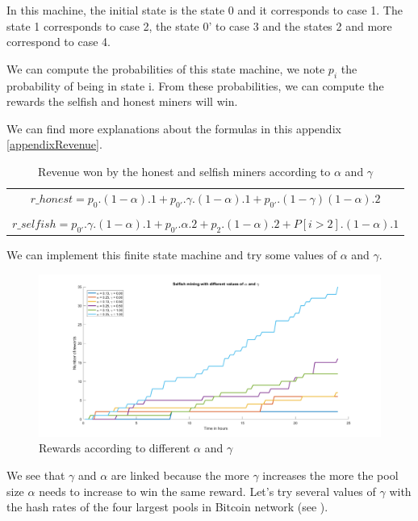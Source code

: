 In this machine, the initial state is the state 0 and it corresponds to case 1. The state 1 corresponds to case 2, the state 0' to case 3 and the states 2 and more correspond to case 4. \newline

We can compute the probabilities of this state machine, we note $p_i$ the probability of being in state i. From these probabilities, we can compute the rewards the selfish and honest miners will win. \newline

We can find more explanations about the formulas in this appendix \ref{appendixRevenue}. \newline

\begin{table}[h]
  \centering

  \begin{tabular}{c}
    $r\_honest =  p_0 . (1 - \alpha) . 1 + p_{0'} . \gamma . (1 - \alpha) . 1 + p_{0'} . (1 - \gamma) (1 - \alpha) . 2$ \\
    \\
    $r\_selfish =  p_{0'} . \gamma . (1 - \alpha) . 1 + p_{0'} . \alpha . 2 + p_2 . (1 - \alpha) . 2 + P[i > 2] . (1 - \alpha) . 1$
  \end{tabular}
  \caption{Revenue won by the honest and selfish miners according to $\alpha$ and $\gamma$}
  \label{revenueFormulas}
\end{table}
\medskip

We can implement this finite state machine and try some values of $\alpha$ and $\gamma$.

\begin{figure}[h]
\centering
\includegraphics[width=12cm]{Figures/selfishGraph}
\caption{Rewards according to different $\alpha$ and $\gamma$}
\end{figure}
\medskip

We see that $\gamma$ and $\alpha$ are linked because the more $\gamma$ increases the more the pool size $\alpha$ needs to increase to win the same reward. Let's try several values of $\gamma$ with the hash rates of the four largest pools in Bitcoin network (see \cite{hashrate_pools}).

